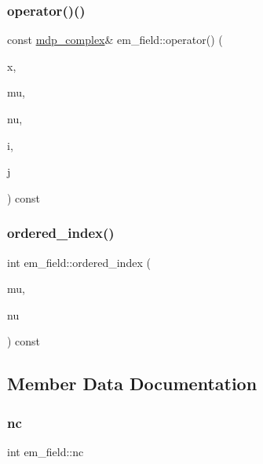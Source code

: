 \subsubsection{\texorpdfstring{operator()()}{operator()()}\hspace{0.1cm}{\footnotesize\ttfamily [3/3]}}
{\footnotesize\ttfamily const \hyperlink{classmdp__complex}{mdp\+\_\+complex}\& em\+\_\+field\+::operator() (\begin{DoxyParamCaption}\item[{\hyperlink{mdp__compatibility__macros_8h_aa6f1179c424e48adef1cedf7c436eb75}{site}}]{x,  }\item[{int}]{mu,  }\item[{int}]{nu,  }\item[{int}]{i,  }\item[{int}]{j }\end{DoxyParamCaption}) const\hspace{0.3cm}{\ttfamily [inline]}}

\mbox{\label{classem__field_a71365b0847b95d3f84915ca1c25d7121}} 
\subsubsection{\texorpdfstring{ordered\+\_\+index()}{ordered\_index()}}
{\footnotesize\ttfamily int em\+\_\+field\+::ordered\+\_\+index (\begin{DoxyParamCaption}\item[{int}]{mu,  }\item[{int}]{nu }\end{DoxyParamCaption}) const\hspace{0.3cm}{\ttfamily [inline]}}



\subsection{Member Data Documentation}
\mbox{\label{classem__field_ab6fc146b5a94cf5961a133e55f832cd4}} 
\subsubsection{\texorpdfstring{nc}{nc}}
{\footnotesize\ttfamily int em\+\_\+field\+::nc}

